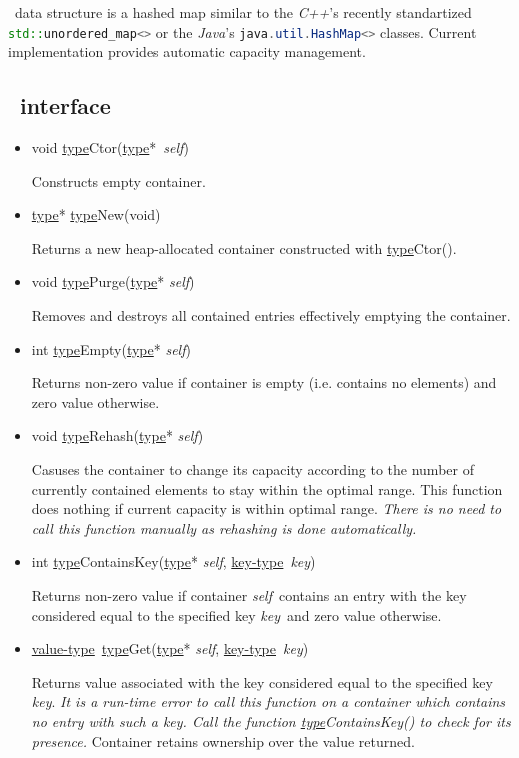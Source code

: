 \documentclass[a4paper]{article}
\newcommand{\Cpp}{\emph{C++}}
\newcommand{\Java}{\emph{Java}}
\newcommand{\st}{\underline{type}}
\newcommand{\kt}{\underline{key-type}}
\newcommand{\vt}{\underline{value-type}}
\newcommand{\sv}{\emph{self}}
\newcommand{\kv}{\emph{key}}
\newcommand{\meth}[1]{#1}
\begin{document}
\Hashmap\ data structure is a hashed map similar to the \Cpp's recently standartized \lstinline[language=C++]{std::unordered_map<>} or the \Java's \lstinline[language=Java]{java.util.HashMap<>} classes.
Current implementation provides automatic capacity management.


\subsection{\Hashmap\ interface}


\begin{itemize}


\item \meth{void \st Ctor(\st*\ \sv)}


Constructs empty container.


\item \meth{\st* \st New(void)}


Returns a new heap-allocated container constructed with \meth{\st Ctor()}.


\commonmethods


\item \meth{void \st Purge}(\st* \sv)


Removes and destroys all contained entries effectively emptying the container.


\item \meth{int \st Empty}(\st* \sv)


Returns non-zero value if container is empty (i.e. contains no elements) and zero value otherwise.


\item \meth{void \st Rehash(\st* \sv)}


Casuses the container to change its capacity according to the number of currently contained elements to stay within the optimal range.
This function does nothing if current capacity is within optimal range.
\emph{There is no need to call this function manually as rehashing is done automatically.}


\item \meth{int \st ContainsKey(\st* \sv, \kt\ \kv)}


Returns non-zero value if container \sv\ contains an entry with the key considered equal to the specified key \kv\ and zero value otherwise.


\item \meth{\vt\ \st Get(\st* \sv, \kt\ \kv)}


Returns value associated with the key considered equal to the specified key \kv.
\emph{It is a run-time error to call this function on a container which contains no entry with such a key. Call the function \meth{\st ContainsKey()} to check for its presence.}
Container retains ownership over the value returned.



\end{itemize}
\end{document}
